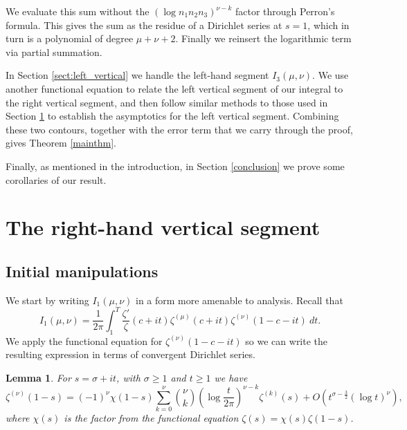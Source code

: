 \documentclass[12pt, a4paper,reqno]{amsart}
\newtheorem{lemma}{Lemma}
\theoremstyle{definition}
\numberwithin{equation}{section}
\begin{document}
We evaluate this sum without the $(\log n_1 n_2 n_3)^{\nu-k}$ factor through Perron's formula. This gives the sum as the residue of a Dirichlet series at $s=1$, which in turn is a polynomial of degree $\mu+\nu+2$. Finally we reinsert the logarithmic term via partial summation.

In Section \ref{sect:left_vertical} we handle the left-hand segment $I_3(\mu,\nu)$. We use another functional equation to relate the left vertical segment of our integral to the right vertical segment, and then follow similar methods to those used in Section \ref{sect:right_vertical} to establish the asymptotics for the left vertical segment. Combining these two contours, together with the error term that we carry through the proof, gives Theorem \ref{mainthm}.

Finally, as mentioned in the introduction,  in Section \ref{conclusion} we prove some corollaries of our result.





\section{The right-hand vertical segment}\label{sect:right_vertical}
\subsection{Initial manipulations} \hfill

We start by writing $I_1(\mu,\nu)$ in a form more amenable to analysis. Recall that \begin{equation*}
    I_1(\mu,\nu)=\frac{1}{2\pi}\int_1^T\frac{\zeta'}{\zeta}(c+it)\zeta^{(\mu)}(c+it)\zeta^{(\nu)}(1-c-it)\ dt.
\end{equation*}
We apply the functional equation for $\zeta^{(\nu)}(1-c-it)$ so we can write the resulting expression in terms of convergent Dirichlet series.

\begin{lemma}\cite[Lemma 4]{discreteMVT}\label{logderiv}
    For $s=\sigma+it$, with $\sigma\ge 1$ and $t\ge 1$ we have 
    \begin{equation}\label{logderiveq}
        \zeta^{(\nu)}(1-s)=(-1)^{\nu}\chi(1-s)\sum_{k=0}^{\nu} \binom{\nu}{k}\left(\log\frac{t}{2\pi}\right)^{\nu-k} \zeta^{(k)}(s)+O\left(t^{\sigma-\frac{3}{2}}(\log t)^{\nu} \right),
    \end{equation}
    where $\chi(s)$ is the factor from the functional equation $\zeta(s)=\chi(s)\zeta(1-s)$.
\end{lemma}
\end{document}
